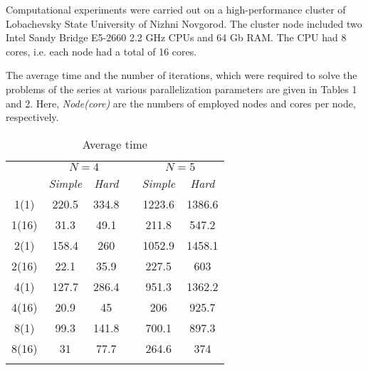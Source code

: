 \documentclass[smallextended]{svjour3}       %
\begin{document}
Computational experiments were carried out on a high-performance cluster of Lobachevsky State University of Nizhni Novgorod. The cluster node included two Intel Sandy Bridge E5-2660 2.2 GHz CPUs and 64 Gb RAM. The CPU had 8 cores, i.e. each node had a total of 16 cores.

The average time and the number of iterations, which were required to solve the problems of the series at various parallelization parameters are given in Tables 1 and 2. Here, \textit{Node(core)} are the numbers of employed  nodes and cores per node, respectively.

\begin{table}
	\caption{Average time}
	\label{tab:1}
	\center
	\begin{tabular}{cccccc}
		\hline\noalign{\smallskip}
		\multirow{2}{*}{\textit{Node(core)}} & \multicolumn{2}{c}{ $N=4$ } & & \multicolumn{2}{c}{$N=5$} \\
		\noalign{\smallskip} \cline{2-3} \cline{5-6} \noalign{\smallskip}
		 & \textit{Simple} & \textit{Hard} & & \textit{Simple} & \textit{Hard}  \\
		\noalign{\smallskip} \hline \noalign{\smallskip}
1(1)	&	220.5	&	334.8	&	&	1223.6	&	1386.6	\\
1(16)	&	31.3	&	49.1	&	&	211.8	&	547.2	\\
2(1)	&	158.4	&	260	&	&	1052.9	&	1458.1	\\
2(16)	&	22.1	&	35.9	&	&	227.5	&	603	\\
4(1)	&	127.7	&	286.4	&	&	951.3	&	1362.2	\\
4(16)	&	20.9	&	45	&	&	206	&	925.7	\\
8(1)	&	99.3	&	141.8	&	&	700.1	&	897.3	\\
8(16)	&	31	&	77.7	&	&	264.6	&	374	\\
		\noalign{\smallskip}\hline
	\end{tabular}
\end{table}
\end{document}
